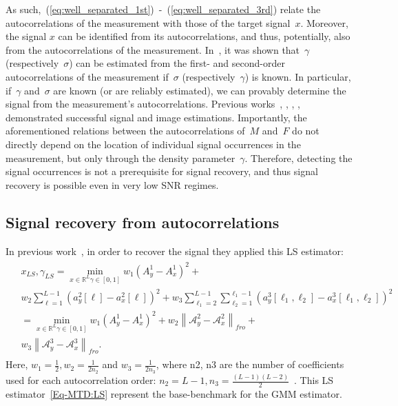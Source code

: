 \documentclass{article}
\newcommand{\asafc}[1]{{\color{blue}{[Asaf: #1]}}}
\newcommand{\A}[0]{\mathcal{A}}
\newcommand{\R}[0]{\mathbb{R}}
\begin{document}
\asafc{I'm not sure that this is relevant. We should only mention that 3 auto' are enough in order to recover $x$ and $\gamma$}As such,~\mbox{(\ref{eq:well_separated_1st}) -~(\ref{eq:well_separated_3rd})} relate the autocorrelations of the measurement with those of the target signal~$x$. Moreover, the signal $x$ can be identified from its autocorrelations, and thus, potentially, also from the autocorrelations of the measurement. In~\cite{bendory2019multi}, it was shown that~$\gamma$ (respectively~$\sigma$) can be estimated from the first- and second-order autocorrelations of the measurement if~$\sigma$ (respectively~$\gamma$) is known. In particular, if~$\gamma$ and~$\sigma$ are known (or are reliably estimated), we can provably determine the signal from the measurement's autocorrelations. Previous works~\cite{bendory2019multi}, \cite{lan2020multi}, \cite{marshall2020image}, \cite{bendory2021multi}, \cite{kreymer2021two} demonstrated successful signal and image estimations. Importantly, the aforementioned relations between the autocorrelations of~$M$ and~$F$ do not directly depend on the location of individual signal occurrences in the measurement, but only through the density parameter~$\gamma$. Therefore, detecting the signal occurrences is not a prerequisite for signal recovery, and thus signal recovery is possible even in very low SNR regimes.

\subsection{Signal recovery from autocorrelations}
In previous work~\cite{bendory2019multi}, in order to recover the signal they applied this LS estimator:
\begin{align} \label{Eq-MTD:LS}
	\begin{split}
	&x_{LS}, \gamma_{LS} = \min_{
			\scriptscriptstyle{x\in\R^L \gamma \in [0,1]}}
		 w_1 (A_y^1 - A_x^1)^2 +  \\
		  &w_2 \sum_{\ell=1}^{L-1} (a_y^2[\ell] - a_x^2[\ell])^2 + 
	 w_3 \sum_{\ell_1=2}^{L-1}\sum_{\ell_2 = 1}^{\ell_1-1}  (a_y^3[\ell_1,\ell_2] - a_x^3[\ell_1,\ell_2])^2 \\
	 &=\min_{
	\scriptscriptstyle{x\in\R^L \gamma \in [0,1]}} w_1 (A_y^1 - A_x^1)^2 + w_2 \left\|\A_y^2 - \A_x^2 \right\|_{fro} +
	\\
	& w_3 \left\|\A_y^3 - \A_x^3 \right\|_{fro}.
	\end{split}
\end{align}
Here, $w_1 = \frac{1}{2}, w_2 = \frac{1}{2n_2}$ and $w_3 = \frac{1}{2n_3}$, where n2, n3 are the number of coefficients used for each
autocorrelation order: $n_2 = L-1, n_3 = \frac{(L-1)(L-2)}{2}$~\cite{8362313}.
This LS estimator~\eqref{Eq-MTD:LS} represent the base-benchmark for the GMM estimator.
\end{document}
